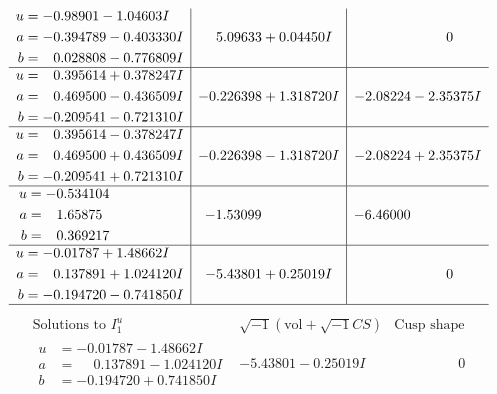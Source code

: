 \documentclass[1p]{elsarticle_modified}
\theoremstyle{definition}
\newcommand{\I}{\sqrt{-1}}
\begin{document}
$$\begin{array}{c|c|c}
\begin{aligned}
u &= -0.98901 - 1.04603 I \\
a &= -0.394789 - 0.403330 I \\
b &= \phantom{-}0.028808 - 0.776809 I\end{aligned}
 & \phantom{-}5.09633 + 0.04450 I & \phantom{-0.000000 } 0 \\ \hline\begin{aligned}
u &= \phantom{-}0.395614 + 0.378247 I \\
a &= \phantom{-}0.469500 - 0.436509 I \\
b &= -0.209541 - 0.721310 I\end{aligned}
 & -0.226398 + 1.318720 I & -2.08224 - 2.35375 I \\ \hline\begin{aligned}
u &= \phantom{-}0.395614 - 0.378247 I \\
a &= \phantom{-}0.469500 + 0.436509 I \\
b &= -0.209541 + 0.721310 I\end{aligned}
 & -0.226398 - 1.318720 I & -2.08224 + 2.35375 I \\ \hline\begin{aligned}
u &= -0.534104\phantom{ +0.000000I} \\
a &= \phantom{-}1.65875\phantom{ +0.000000I} \\
b &= \phantom{-}0.369217\phantom{ +0.000000I}\end{aligned}
 & -1.53099\phantom{ +0.000000I} & -6.46000\phantom{ +0.000000I} \\ \hline\begin{aligned}
u &= -0.01787 + 1.48662 I \\
a &= \phantom{-}0.137891 + 1.024120 I \\
b &= -0.194720 - 0.741850 I\end{aligned}
 & -5.43801 + 0.25019 I & \phantom{-0.000000 } 0\\
 \hline 
 \end{array}$$\newpage$$\begin{array}{c|c|c}  
\text{Solutions to }I^u_{1}& \I (\text{vol} + \sqrt{-1}CS) & \text{Cusp shape}\\
 \hline 
\begin{aligned}
u &= -0.01787 - 1.48662 I \\
a &= \phantom{-}0.137891 - 1.024120 I \\
b &= -0.194720 + 0.741850 I\end{aligned}
 & -5.43801 - 0.25019 I & \phantom{-0.000000 } 0 \\ \hline\begin{aligned}

\end{aligned}
\end{array}$$
\end{document}

